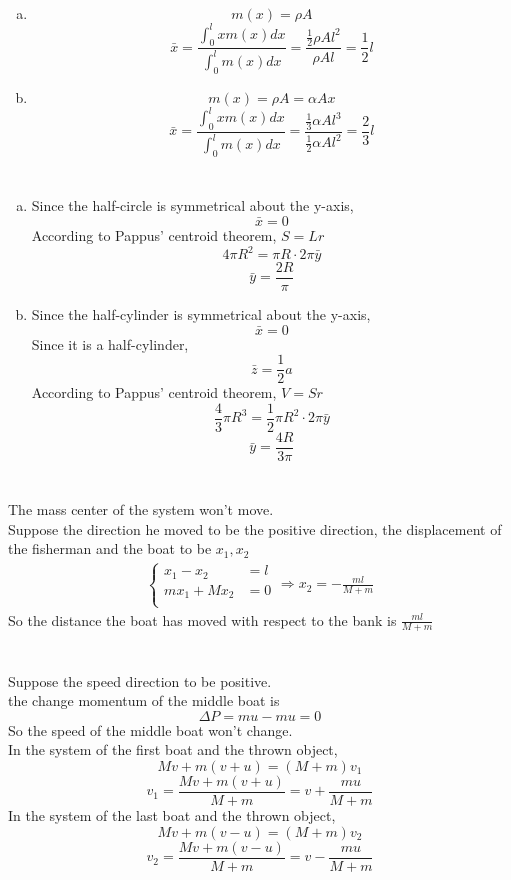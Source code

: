 \documentclass{article}
\begin{document}
\section{}
\begin{enumerate}[(a)]
	\item
	$$m(x)=\rho A$$
	$$\bar{x}=\frac{\int_0^lxm(x)dx}{\int_0^lm(x)dx}=\frac{\frac{1}{2}\rho Al^2}{\rho Al}=\frac{1}{2}l$$	
	\item
	$$m(x)=\rho A=\alpha Ax$$
	$$\bar{x}=\frac{\int_0^lxm(x)dx}{\int_0^lm(x)dx}=\frac{\frac{1}{3}\alpha Al^3}{\frac{1}{2}\alpha Al^2}=\frac{2}{3}l$$
\end{enumerate}
	
\section{}
\begin{enumerate}[(a)]
	\item
	Since the half-circle is symmetrical about the y-axis,
	$$\bar{x}=0$$
	According to Pappus’ centroid theorem, $S=Lr$
	$$4\pi R^2=\pi R\cdot2\pi\bar{y}$$
	$$\bar{y}=\frac{2R}{\pi}$$
	\item
	Since the half-cylinder is symmetrical about the y-axis,
	$$\bar{x}=0$$
	Since it is a half-cylinder,
	$$\bar{z}=\frac{1}{2}a$$
	According to Pappus’ centroid theorem, $V=Sr$
	$$\frac{4}{3}\pi R^3=\frac{1}{2}\pi R^2\cdot2\pi\bar{y}$$
	$$\bar{y}=\frac{4R}{3\pi}$$
\end{enumerate}

\section{}
	The mass center of the system won't move.\\
	Suppose the direction he moved to be the positive direction, the displacement of the fisherman and the boat to be $x_1,x_2$
	\begin{eqnarray*}
	\left\{
		\begin{array}{ll}
		x_1-x_2&=l\\
		mx_1+Mx_2&=0\\
		\end{array}
	\right.\Longrightarrow
		x_2=-\frac{ml}{M+m}
	\end{eqnarray*}
	So the distance the boat has moved with respect to the bank is $\frac{ml}{M+m}$

\section{}
	Suppose the speed direction to be positive.\\
	the change momentum of the middle boat is
	$$\Delta P=mu-mu=0$$
	So the speed of the middle boat won't change.\\
	In the system of the first boat and the thrown object,
	$$Mv+m(v+u)=(M+m)v_1$$
	$$v_1=\frac{Mv+m(v+u)}{M+m}=v+\frac{mu}{M+m}$$
	In the system of the last boat and the thrown object,
	$$Mv+m(v-u)=(M+m)v_2$$
	$$v_2=\frac{Mv+m(v-u)}{M+m}=v-\frac{mu}{M+m}$$
\end{document}
